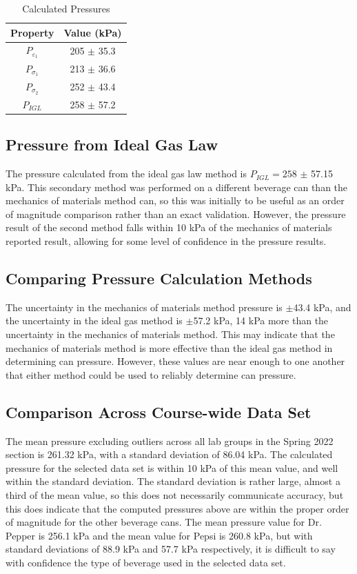 \documentclass[10pt,journal,letterpaper]{IEEEtran}
\begin{document}
\begin{table}[H]
\renewcommand\arraystretch{1.25}
\centering
\caption{Calculated Pressures}
\begin{tabular}{cc}
\hline \hline
Property & Value (kPa) \\
\hline
$P_{\varepsilon_1}$ & 205 $\pm$ 35.3 \\
$P_{\sigma_1}$ & 213 $\pm$ 36.6 \\
$P_{\sigma_2}$ & 252 $\pm$ 43.4 \\
$P_{IGL}$ & 258 $\pm$ 57.2 \\
\hline \hline
\end{tabular}
\label{tab:CalcedP}
\end{table}

\subsection{Pressure from Ideal Gas Law}

The pressure calculated from the ideal gas law method is $P_{IGL}=258$ $\pm$ 57.15 kPa.
This secondary method was performed on a different beverage can than the mechanics of materials method can, so this was initially to be useful as an order of magnitude comparison rather than an exact validation.
However, the pressure result of the second method falls within 10 kPa of the mechanics of materials reported result, allowing for some level of confidence in the pressure results.

\subsection{Comparing Pressure Calculation Methods}

The uncertainty in the mechanics of materials method pressure is $\pm$43.4 kPa, and the uncertainty in the ideal gas method is $\pm$57.2 kPa, 14 kPa more than the uncertainty in the mechanics of materials method.
This may indicate that the mechanics of materials method is more effective than the ideal gas method in determining can pressure.
However, these values are near enough to one another that either method could be used to reliably determine can pressure. 

\subsection{Comparison Across Course-wide Data Set}

The mean pressure excluding outliers across all lab groups in the Spring 2022 section is 261.32 kPa, with a standard deviation of 86.04 kPa.
The calculated pressure for the selected data set is within 10 kPa of this mean value, and well within the standard deviation.
The standard deviation is rather large, almost a third of the mean value, so this does not necessarily communicate accuracy, but this does indicate that the computed pressures above are within the proper order of magnitude for the other beverage cans.
The mean pressure value for Dr. Pepper is 256.1 kPa and the mean value for Pepsi is 260.8 kPa, but with standard deviations of 88.9 kPa and 57.7 kPa respectively, it is difficult to say with confidence the type of beverage used in the selected data set.
\end{document}
